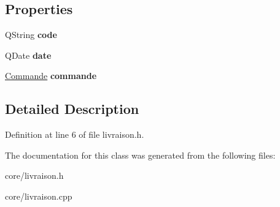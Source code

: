 \subsection*{Properties}
\begin{DoxyCompactItemize}
\item 
\hypertarget{class_livraison_ae8c3a787cc05a20a06d43acfe3c78418}{
QString {\bfseries code}}
\label{class_livraison_ae8c3a787cc05a20a06d43acfe3c78418}

\item 
\hypertarget{class_livraison_a3045054386f06bf6d51a1c8dc96aa554}{
QDate {\bfseries date}}
\label{class_livraison_a3045054386f06bf6d51a1c8dc96aa554}

\item 
\hypertarget{class_livraison_a5abe69344f87b1ec9f8a1a82a274ae45}{
\hyperlink{class_commande}{Commande} {\bfseries commande}}
\label{class_livraison_a5abe69344f87b1ec9f8a1a82a274ae45}

\end{DoxyCompactItemize}


\subsection{Detailed Description}


Definition at line 6 of file livraison.h.



The documentation for this class was generated from the following files:\begin{DoxyCompactItemize}
\item 
core/livraison.h\item 
core/livraison.cpp\end{DoxyCompactItemize}
